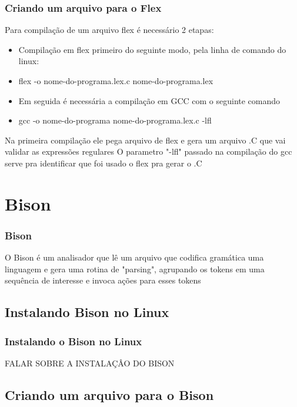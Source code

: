 \documentclass{beamer}
\begin{document}
\begin{frame}
\frametitle{Criando um arquivo para o Flex}
	Para compilação de um arquivo flex é necessário 2 etapas:
	  \begin{itemize} 				%
	    \item<1->   Compilação em flex primeiro do seguinte modo, pela linha de comando do linux:	%
	    \item<2-> flex -o nome-do-programa.lex.c nome-do-programa.lex
	    \item<3-> Em seguida é necessária a compilação em GCC com o seguinte comando\:
	    \item<4-> gcc -o nome-do-programa nome-do-programa.lex.c -lfl
    \end{itemize}

	Na primeira compilação ele pega arquivo de flex e gera um arquivo .C que vai validar as expressões regulares 
O parametro "-lfl" passado na compilação do gcc serve pra identificar que foi usado o flex pra gerar o .C

	
\end{frame}

\section{Bison}
\begin{frame}
\frametitle{Bison}

O Bison é um analisador que lê um arquivo que codifica gramática uma linguagem e gera uma rotina
de "parsing", agrupando os tokens em uma sequência de interesse e invoca ações para esses tokens

\end{frame}
\subsection{Instalando Bison no Linux}
\begin{frame}
\frametitle{Instalando o Bison no Linux}

FALAR SOBRE A INSTALAÇÂO DO BISON

\end{frame}

\subsection{Criando um arquivo para o Bison}
\end{document}
